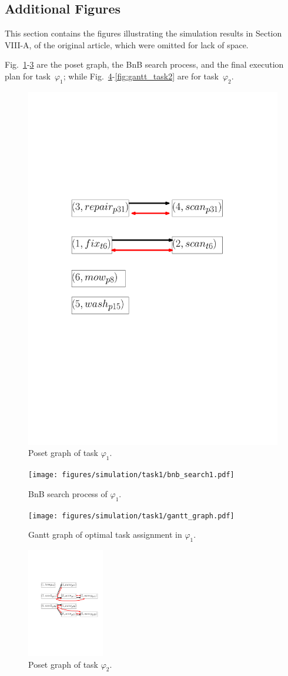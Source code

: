\subsection{Additional Figures}
This section contains the figures illustrating the simulation results
in Section VIII-A,
of the original article, which were omitted for lack of space.

Fig.~\ref{fig:poset_graph1}-\ref{fig:gantt_task1} are the poset graph, the BnB search process,
and the final execution plan for task~$\varphi_1$;
while Fig.~\ref{fig:poset_graph2}-\ref{fig:gantt_task2} are for task~$\varphi_2$.
\begin{figure}[htbp]
		\centering%
		\includegraphics[width =0.18 \textwidth]{figures/simulation/task1/ipe_poset_graph.pdf}
		\caption{Poset graph of task $\varphi_1$. }
                \label{fig:poset_graph1}
\end{figure}

\begin{figure}[htbp]
	\centering
	\texttt{[image: figures/simulation/task1/bnb\_search1.pdf]}
	\caption{ BnB search process of $\varphi_1$.}
        \label{fig:hesse_task1}
\end{figure}

\begin{figure}[htbp]
		\centering
\texttt{[image: figures/simulation/task1/gantt\_graph.pdf]}
\caption{Gantt graph of optimal task assignment in $\varphi_1$.}
\label{fig:gantt_task1}
\end{figure}


\begin{figure}[htbp]
		\centering%
\includegraphics[width =0.3\textwidth]{figures/simulation/task2/ipe_poset_graph.pdf}
\caption{Poset graph of task $\varphi_2$.}
\label{fig:poset_graph2}
\end{figure}

